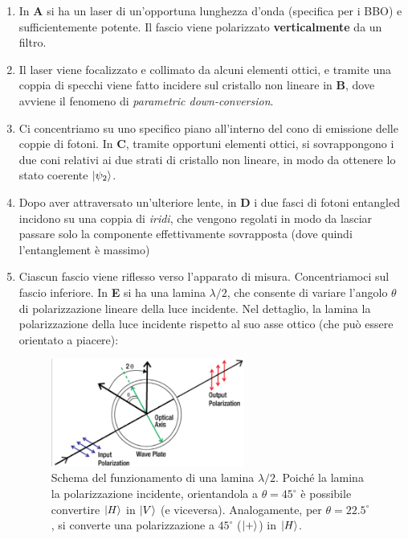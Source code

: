\documentclass[../../InformazioneQuantistica.tex]{subfiles}
\begin{document}
\begin{enumerate}
    \item In \textbf{A} si ha un laser di un'opportuna lunghezza d'onda (specifica per i BBO) e sufficientemente potente. Il fascio viene polarizzato \textbf{verticalmente} da un filtro.
    \item Il laser viene focalizzato e collimato da alcuni elementi ottici, e tramite una coppia di specchi viene fatto incidere sul cristallo non lineare in \textbf{B}, dove avviene il fenomeno di \textit{parametric down-conversion}.
    \item Ci concentriamo su uno specifico piano all'interno del cono di emissione delle coppie di fotoni. In \textbf{C}, tramite opportuni elementi ottici, si sovrappongono i due coni relativi ai due strati di cristallo non lineare, in modo da ottenere lo stato coerente $\Ket{\psi_2}$.
    \item Dopo aver attraversato un'ulteriore lente, in \textbf{D} i due fasci di fotoni entangled incidono su una coppia di \textit{iridi}, che vengono regolati in modo da lasciar passare solo la componente effettivamente sovrapposta (dove quindi l'entanglement è massimo)
    \item Ciascun fascio viene riflesso verso l'apparato di misura. Concentriamoci sul fascio inferiore. In \textbf{E} si ha una lamina $\lambda/2$, che consente di variare l'angolo $\theta$ di polarizzazione lineare della luce incidente. Nel dettaglio, la lamina  la polarizzazione della luce incidente rispetto al suo asse ottico (che può essere orientato a piacere):
    \begin{figure}[H]
        \centering
        \includegraphics[width=0.6\textwidth]{Immagini/28_3/lambda2.PNG}
        \caption{Schema del funzionamento di una lamina $\lambda/2$. Poiché la lamina  la polarizzazione incidente, orientandola a $\theta = 45^\circ$ è possibile convertire $\Ket{H}$ in $\Ket{V}$ (e viceversa). Analogamente, per $\theta=22.5^\circ$, si converte una polarizzazione a $45^\circ$ ($\Ket{+}$) in $\Ket{H}$.}
        \label{fig:my_label}

\end{figure}
\end{enumerate}
\end{document}
